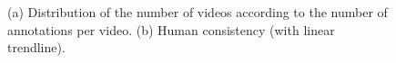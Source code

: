 \documentclass[sigconf]{acmart}
\begin{document}
\begin{figure}[!htbp]
	\centering
	\quad
	\quad
	\caption{\label{fig:human_consistency}(a) Distribution of the number of videos according to the number of annotations per video. (b) Human consistency (with linear trendline).}
\end{figure}
\end{document}
